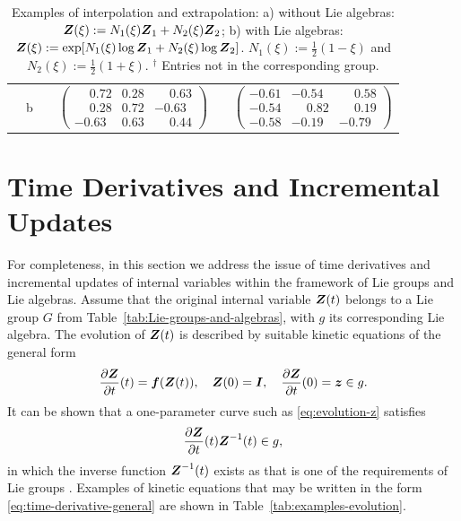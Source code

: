 \documentclass[12pt]{article}
\begin{document}
\begin{table}[htbp]
\begin{center}
\begin{tabular}{ c c c c c c}
      &
      \multirow{2}{*}{b}
      &

      &
      \multirow{2}{*}{
        $\left(
          \begin{smallmatrix}
            \phantom{-}0.72 & 0.28 & \phantom{-}0.63\\
            \phantom{-}0.28 & 0.72 & -0.63\\
            -0.63 & 0.63 & \phantom{-}0.44
          \end{smallmatrix}
        \right)$}
      &

      &
      \multirow{2}{*}{
        $\left(
          \begin{smallmatrix}
            -0.61 & -0.54 & \phantom{-}0.58\\
            -0.54 & \phantom{-}0.82 & \phantom{-}0.19\\
            -0.58 & -0.19 & -0.79
          \end{smallmatrix}
        \right)$}
      \\
      \\
      \bottomrule
    \end{tabular}
    \caption{Examples of interpolation and extrapolation: a) without
      Lie algebras: ${\boldsymbol{Z}}(\xi) := N_1(\xi){\boldsymbol{Z}}_1 + N_2(\xi){\boldsymbol{Z}}_2$; b)
      with Lie algebras: ${\boldsymbol{Z}}(\xi) := \exp[N_1(\xi)\log{\boldsymbol{Z}}_1 +
      N_2(\xi)\log{\boldsymbol{Z}}_2]$. $N_1(\xi):=\frac{1}{2}(1-\xi)$ and
      $N_2(\xi):=\frac{1}{2}(1+\xi)$. $^\dagger$ Entries not in
      the corresponding group.}
    \label{tab:examples-interpolation}
  \end{center}
\end{table}

\section{Time Derivatives and Incremental Updates}
\label{sec:derivatives}

For completeness, in this section we address the issue of time
derivatives and incremental updates of internal variables within the
framework of Lie groups and Lie algebras. Assume that the original
internal variable ${\boldsymbol{Z}}(t)$ belongs to a Lie group $G$ from
Table~\ref{tab:Lie-groups-and-algebras}, with $g$ its corresponding Lie
algebra. The evolution of ${\boldsymbol{Z}}(t)$ is described by suitable kinetic
equations of the general form
\begin{equation} \label{eq:evolution-z}
  \frac{\partial {\boldsymbol{Z}}}{\partial t}(t) = {\boldsymbol{f}}({\boldsymbol{Z}}(t)), \quad
  {\boldsymbol{Z}}(0) = {\boldsymbol{I}}, \quad
  \frac{\partial {\boldsymbol{Z}}}{\partial t}(0) = {\boldsymbol{z}} \in g.
\end{equation}
It can be shown that a one-parameter curve such as
\eqref{eq:evolution-z} satisfies
\begin{equation} \label{eq:time-derivative-general}
  \frac{\partial {\boldsymbol{Z}}}{\partial t}(t) {\boldsymbol{Z}}^{-1}(t) \in g,
\end{equation}
in which the inverse function ${\boldsymbol{Z}}^{-1}(t)$ exists as that is one of
the requirements of Lie groups \citep{Procesi:2006, Sepanski:2007,
  Kosmann-Schwarzbach:2009, Gallier:2011}. Examples of kinetic
equations that may be written in the form
\eqref{eq:time-derivative-general} are shown in
Table~\ref{tab:examples-evolution}.
\end{document}
